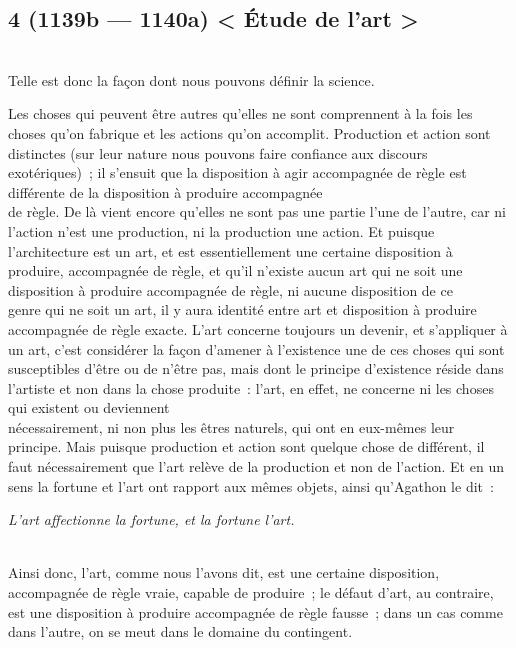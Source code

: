 \documentclass[french,twoside]{book} %
\begin{document}
\subsection[{4 (1139b — 1140a) < Étude de l’art >}]{4 (1139b — 1140a) < Étude de l’art >}
\noindent \\
Telle est donc la façon dont nous pouvons définir la science.\par
 Les choses qui peuvent être autres qu’elles ne sont comprennent à la fois les choses qu’on fabrique et les actions qu’on accomplit. Production et action sont distinctes (sur leur nature nous pouvons faire confiance aux discours exotériques) ; il s’ensuit que la disposition à agir accompagnée de règle est différente de la disposition à produire accompagnée \\
de règle. De là vient encore qu’elles ne sont pas une partie l’une de l’autre, car ni l’action n’est une production, ni la production une action. Et puisque l’architecture est un art, et est essentiellement une certaine disposition à produire, accompagnée de règle, et qu’il n’existe aucun art qui ne soit une disposition à produire accompagnée de règle, ni aucune disposition de ce \\
genre qui ne soit un art, il y aura identité entre art et disposition à produire accompagnée de règle exacte. L’art concerne toujours un devenir, et s’appliquer à un art, c’est considérer la façon d’amener à l’existence une de ces choses qui sont susceptibles d’être ou de n’être pas, mais dont le principe d’existence réside dans l’artiste et non dans la chose produite : l’art, en effet, ne concerne ni les choses qui existent ou deviennent \\
nécessairement, ni non plus les êtres naturels, qui ont en eux-mêmes leur principe. Mais puisque production et action sont quelque chose de différent, il faut nécessairement que l’art relève de la production et non de l’action. Et en un sens la fortune et l’art ont rapport aux mêmes objets, ainsi qu’Agathon le dit :\par
 {\itshape L’art affectionne la fortune, et la fortune l’art.} \par
\\
Ainsi donc, l’art, comme nous l’avons dit, est une certaine disposition, accompagnée de règle vraie, capable de produire ; le défaut d’art, au contraire, est une disposition à produire accompagnée de règle fausse ; dans un cas comme dans l’autre, on se meut dans le domaine du contingent.
\end{document}
